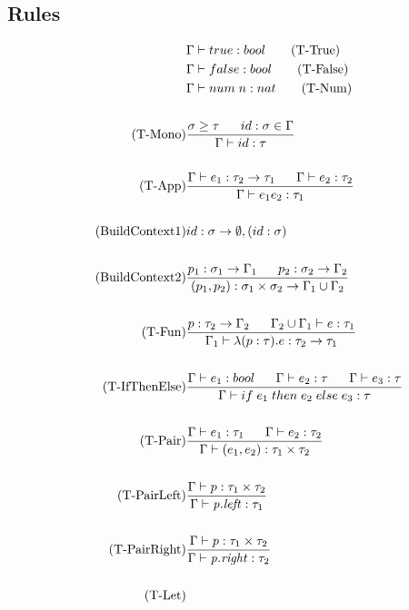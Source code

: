\documentclass[10pt,a4paper,draft]{article}
\begin{document}
\begin{flushleft}
\subsection{Rules}
\begin{align*}
&\Gamma \vdash true : bool \tag{T-True} \\
&\Gamma \vdash false : bool \tag{T-False} \\
&\Gamma \vdash num \; n : nat \tag{T-Num} \\ \\
\tag{T-Mono}
&\frac{\sigma \geq \tau \longspace id:\sigma \in \Gamma}{\Gamma \vdash id:\tau}\\ \\
\tag{T-App}
&\frac{\Gamma \vdash e_{1}:\tau_{2} \rightarrow \tau_{1} \longspace \Gamma \vdash e_{2}:\tau_{2}}
{\Gamma \vdash e_{1}e_{2}:\tau_{1}} \\ \\
\tag{BuildContext1}
& id:\sigma \rightarrow \emptyset, (id:\sigma) \\ \\
\tag{BuildContext2}
&\frac{p_{1}:\sigma_{1} \rightarrow \Gamma_{1} \longspace p_{2}:\sigma_{2}\rightarrow \Gamma_{2}}
{(p_{1},p_{2}):\sigma_{1}\times \sigma_{2} \rightarrow \Gamma_{1}\cup \Gamma_{2}} \\ \\
\tag{T-Fun}
&\frac{p:\tau_{2} \rightarrow \Gamma_{2} \longspace \Gamma_{2} \cup \Gamma_{1} \vdash e:\tau_{1}}
{\Gamma_{1} \vdash \lambda(p:\tau).e:\tau_{2} \rightarrow \tau_{1}} \\ \\
\tag{T-IfThenElse}
&\frac{\Gamma \vdash e_{1}:bool \longspace \Gamma \vdash e_{2}:\tau \longspace \Gamma \vdash e_{3} : \tau}
{\Gamma \vdash if \; e_{1} \; then \; e_{2} \; else \; e_{3} : \tau} \\ \\
\tag{T-Pair}
&\frac{\Gamma \vdash e_{1}:\tau_{1} \longspace \Gamma \vdash e_{2}:\tau_{2}}
{\Gamma \vdash (e_{1},e_{2}) : \tau_{1}\times\tau_{2}} \\ \\
\tag{T-PairLeft}
&\frac{\Gamma \vdash p:\tau_{1}\times\tau_{2}}
{\Gamma \vdash \mathit{p.left} : \tau_{1}} \\
\\
\tag{T-PairRight}
&\frac{\Gamma \vdash p:\tau_{1}\times\tau_{2}}
{\Gamma \vdash \mathit{p.right} : \tau_{2}} \\
\\
\tag{T-Let}

\end{align*}
\end{flushleft}
\end{document}
